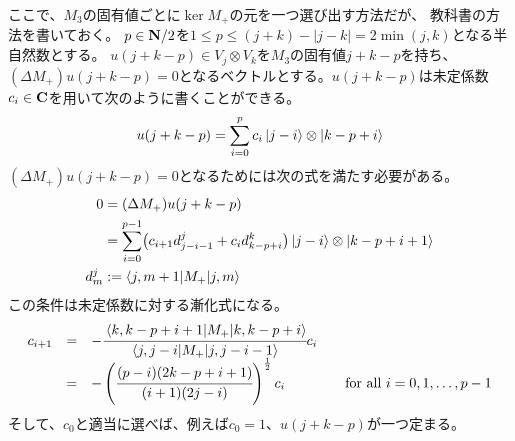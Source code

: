 {	ここで、$M_3$の固有値ごとに$\ker M_+$の元を一つ選び出す方法だが、
	教科書\cite{bk:jinbo.ryousigun}の方法を書いておく。
	$p\in\mathbf{N}/2$を$1\le p\le (j+k)-|j-k|=2\min(j,k)$となる半自然数とする。
	$u(j+k-p)\in V_j\otimes V_k$を$M_3$の固有値$j+k-p$を持ち、
	$(\Delta M_+)u(j+k-p)=0$となるベクトルとする。$u(j+k-p)$は未定係数
	$c_i\in\mathbf{C}$を用いて次のように書くことができる。
	\begin{equation*}\begin{split}
		u(j+k-p) = \sum_{i=0}^p c_i\mathinner{|{j-i}\rangle}\otimes\mathinner{|{k-p+i}\rangle}
	\end{split}\end{equation*}
	$(\Delta M_+)u(j+k-p)=0$となるためには次の式を満たす必要がある。
	\begin{equation*}\begin{split}
		0 &= (\Delta M_+)u(j+k-p) \\
		&= \sum_{i=0}^{p-1}\bigl(c_{i+1}d^j_{j-i-1} + c_id^k_{k-p+i}\bigr)
			\mathinner{|{j-i}\rangle}\otimes\mathinner{|{k-p+i+1}\rangle} \\
		d^j_m &:= \mathinner{\langle{j,m+1|M_+|j,m}\rangle} \\
	\end{split}\end{equation*}
	この条件は未定係数に対する漸化式になる。
	\begin{equation*}\begin{array}{rcll}
		c_{i+1} &=& - \cfrac{\mathinner{\langle{k,k-p+i+1|M_+|k,k-p+i}\rangle}}
			{\mathinner{\langle{j,j-i|M_+|j,j-i-1}\rangle}} c_i \\
		&=& - \left(\cfrac{(p-i)(2k-p+i+1)}{(i+1)(2j-i)}\right)^{\frac{1}{2}}
			c_i &\quad\text{for all } i=0,1,\dots,p-1
	\end{array}\end{equation*}
	そして、$c_0$と適当に選べば、例えば$c_0=1$、$u(j+k-p)$が一つ定まる。

}
